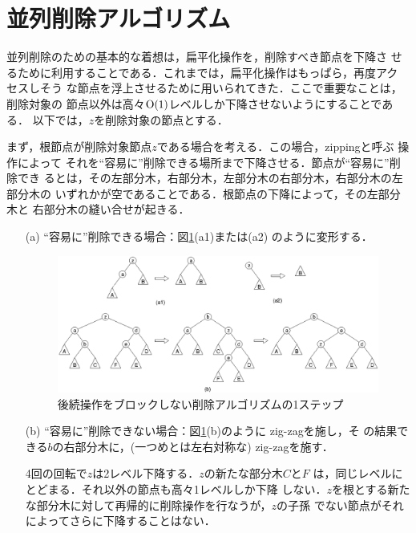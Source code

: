 \documentclass[T]{compsoft}
\begin{document}
\section{並列削除アルゴリズム}\label{section:delete}

並列削除のための基本的な着想は，扁平化操作を，削除すべき節点を下降さ
せるために利用することである．これまでは，扁平化操作はもっぱら，再度アク
セスしそう
な節点を浮上させるために用いられてきた．ここで重要なことは，削除対象の
節点以外は高々${\rm O}(1)$レベルしか下降させないようにすることである．
以下では，$z$を削除対象の節点とする．

まず，根節点が削除対象節点$z$である場合を考える．この場合，zippingと呼ぶ
操作によって
それを``容易に''削除できる場所まで下降させる．節点が``容易に''削除でき
るとは，その左部分木，右部分木，左部分木の右部分木，右部分木の左部分木の
いずれかが空であることである．根節点の下降によって，その左部分木と
右部分木の縫い合せが起きる．
%

\begin{enumerate}
\item[(a)]
``容易に''削除できる場合：図\ref{figure:delete}(a1)または(a2)
のように変形する．


\begin{figure}[t]
  \centerline {\includegraphics {images/fig4.eps}}
\caption{後続操作をブロックしない削除アルゴリズムの1ステップ}
\label{figure:delete}
\end{figure}

\item[(b)]
``容易に''削除できない場合：図\ref{figure:delete}(b)のように
zig-zagを施し，そ
の結果できる$b$の右部分木に，(一つめとは左右対称な) zig-zagを施す．

\noindent
4回の回転で$z$は2レベル下降する．$z$の新たな部分木$C$と$F$
は，同じレベルにとどまる．それ以外の節点も高々1レベルしか下降
しない．$z$を根とする新たな部分木に対して再帰的に削除操作を行なうが，$z$の子孫
でない節点がそれによってさらに下降することはない．
\end{enumerate}
\end{document}
